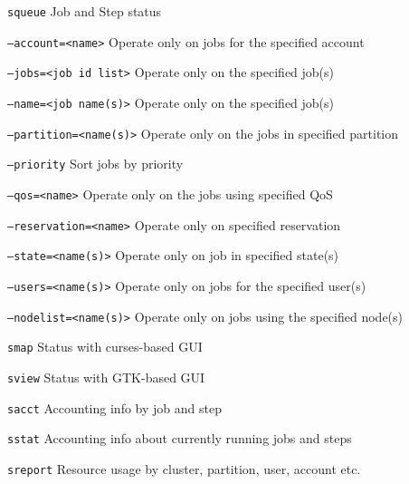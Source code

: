 \documentclass[8pt,portrait]{article}
\newcommand{\code}{\texttt}
\newcommand{\describe}[1]{\begin{description}{#1}\end{description}}
\begin{document}
\begin{multicols*}{2}
\code{squeue}  Job and Step status
\describe{
\itemsep=0pt\parskip=0pt
    \item{\code{--account=<name>}} {Operate only on jobs for the specified account}
    \item{\code{--jobs=<job id list>}} {Operate only on the specified job(s)} 
    \item{\code{--name=<job name(s)>}} {Operate only on the specified job(s)} 
    \item{\code{--partition=<name(s)>}} {Operate only on the jobs in specified partition}
     \item{\code{--priority}} {Sort jobs by priority}
    \item{\code{--qos=<name>}} {Operate only on the jobs using specified QoS}
    \item{\code{--reservation=<name>}} {Operate only on specified reservation}
    \item{\code{--state=<name(s)>}} {Operate only on job in specified state(s)}
    \item{\code{--users=<name(s)>}} {Operate only on jobs for the specified user(s)}
    \item{\code{--nodelist=<name(s)>}} {Operate only on jobs using the specified node(s)}
}
\code{smap}  Status with curses-based GUI

\code{sview}  Status with GTK-based GUI

\code{sacct}  Accounting info by job and step 

\code{sstat}  Accounting info about currently running jobs and steps 

\code{sreport}  Resource usage by cluster, partition, user, account etc. 


\end{multicols*}
\end{document}
